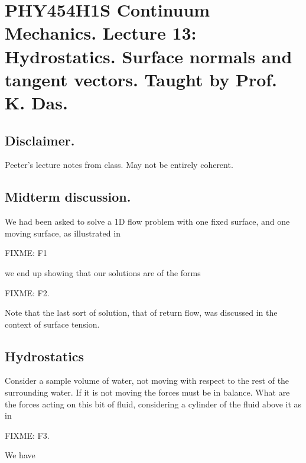 
%

\chapter{PHY454H1S Continuum Mechanics.  Lecture 13: Hydrostatics.  Surface normals and tangent vectors.  Taught by Prof. K. Das.}
\label{chap:continuumL13}
{}
\date{Mar 2, 2012}

\beginArtWithToc


\section{Disclaimer.}

Peeter's lecture notes from class.  May not be entirely coherent.

\section{Midterm discussion.}

We had been asked to solve a 1D flow problem with one fixed surface, and one moving surface, as illustrated in

FIXME: F1

we end up showing that our solutions are of the forms

FIXME: F2.

Note that the last sort of solution, that of return flow, was discussed in the context of surface tension.

\section{Hydrostatics}

Consider a sample volume of water, not moving with respect to the rest of the surrounding water.  If it is not moving the forces must be in balance.  What are the forces acting on this bit of fluid, considering a cylinder of the fluid above it as in 

FIXME: F3.

We have

